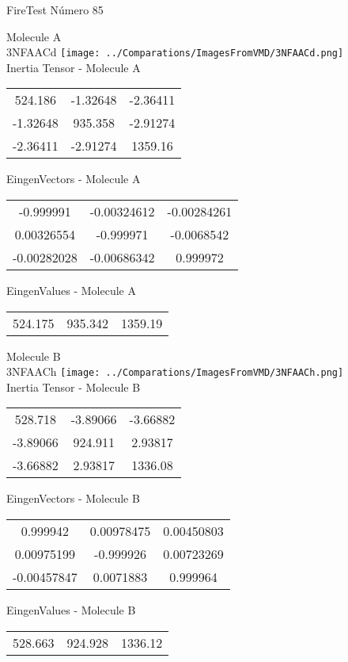 \vtab[-2cm]
\begin{center}
{\large FireTest \tab Número 85}
\end{center}
\begin{multicols}{2}
\begin{center}

Molecule A \\ 
3NFAACd
\texttt{[image: ../Comparations/ImagesFromVMD/3NFAACd.png]}
\\
Inertia Tensor - Molecule A \\
\vtab

\begin{tabular}{|c c c|}
524.186	 & 	-1.32648	 & 	-2.36411	 \\
-1.32648	 & 	935.358	 & 	-2.91274	 \\
-2.36411	 & 	-2.91274	 & 	1359.16
\end{tabular}

\vtab
 EingenVectors - Molecule A     \\
\vtab
\begin{tabular}{|c c c|}
-0.999991	 & 	-0.00324612	 & 	-0.00284261	 \\
0.00326554	 & 	-0.999971	 & 	-0.0068542	 \\
-0.00282028	 & 	-0.00686342	 & 	0.999972
\end{tabular}

\vtab
 EingenValues - Molecule A     \\
\vtab
\begin{tabular}{|c c c|}
524.175	 & 	935.342	 & 	1359.19	 \\
\end{tabular}
\columnbreak

Molecule B \\ 
3NFAACh
\texttt{[image: ../Comparations/ImagesFromVMD/3NFAACh.png]}
\\
Inertia Tensor - Molecule B \\
\vtab

\begin{tabular}{|c c c|}
528.718	 & 	-3.89066	 & 	-3.66882	 \\
-3.89066	 & 	924.911	 & 	2.93817	 \\
-3.66882	 & 	2.93817	 & 	1336.08
\end{tabular}

\vtab
 EingenVectors - Molecule B     \\
\vtab
\begin{tabular}{|c c c|}
0.999942	 & 	0.00978475	 & 	0.00450803	 \\
0.00975199	 & 	-0.999926	 & 	0.00723269	 \\
-0.00457847	 & 	0.0071883	 & 	0.999964
\end{tabular}

\vtab
 EingenValues - Molecule B     \\
\vtab
\begin{tabular}{|c c c|}
528.663	 & 	924.928	 & 	1336.12	 \\
\end{tabular}

\end{center}
\end{multicols}
